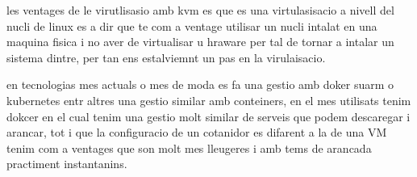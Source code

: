\documentclass[preprint,11pt]{elsarticle}
\begin{document}
les ventages de le virutlisasio amb kvm es que es una virtulasisacio a nivell del nucli de linux es a dir que te com a ventage utilisar un nucli intalat en una maquina fisica i no aver de virtualisar u hraware per tal de tornar a intalar un sistema dintre, per tan ens estalviemnt un pas en la virulaisacio. \smallskip

en tecnologias mes actuals o mes de moda es fa una gestio amb doker suarm o kubernetes entr altres una gestio similar amb conteiners, en el mes utilisats tenim dokcer en el cual tenim una gestio molt similar de serveis que podem descaregar i arancar, tot i que la configuracio de un cotanidor es difarent a la de una VM tenim com a ventages que son molt mes lleugeres i amb tems de arancada practiment instantanins.\smallskip
\end{document}
